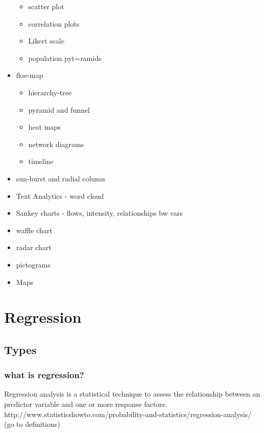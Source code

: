 \documentclass{beamer}
\begin{document}
\begin{frame}[allowframebreaks]
\begin{itemize}
		\begin{itemize}
			\item scatter plot
			\item correlation plots
			\item Likert scale	
			\item population pyt=ramids
		\end{itemize}
		\item floe-map
		\begin{itemize}
			\item hierarchy-tree
			\item pyramid and funnel
			\item heat maps
			\item network diagrams
			\item timeline
		\end{itemize}
		\item sun-burst and radial column
		\item Text Analytics - word cloud
		\item Sankey charts - flows, intensity, relationships bw vars
		\item waffle chart
		\item radar chart
		\item pictograms
		\item Maps
	\end{itemize}
\end{frame}






\section{Regression}


\subsection{Types}

\begin{frame}\frametitle{what is regression?}
	Regression analysis is a statistical technique to assess the relationship between an predictor variable and one or more response factors.\\
	http://www.statisticshowto.com/probability-and-statistics/regression-analysis/
	(go to definitions)
\end{frame}
\end{document}

